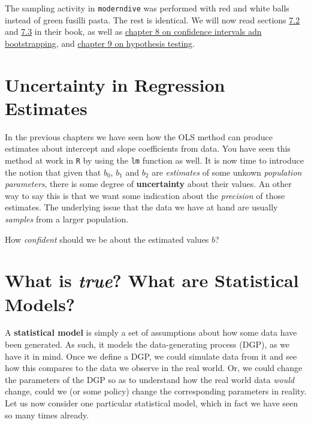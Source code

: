\documentclass[]{book}
\newenvironment{note}{\begin{tcolorbox}[colback=blue!5!white,colframe=blue!75!black]}{\end{tcolorbox}}
\begin{document}
The sampling activity in \texttt{moderndive} was performed with red and white balls instead of green fusilli pasta. The rest is identical. We will now read sections \href{https://moderndive.com/7-sampling.html\#sampling-simulation}{7.2} and \href{https://moderndive.com/7-sampling.html\#sampling-framework}{7.3} in their book, as well as \href{https://moderndive.com/8-confidence-intervals.html}{chapter 8 on confidence intervals adn bootstrapping}, and \href{https://moderndive.com/9-hypothesis-testing.html}{chapter 9 on hypothesis testing}.

\hypertarget{uncertainty-in-regression-estimates}{%
\section{Uncertainty in Regression Estimates}\label{uncertainty-in-regression-estimates}}

In the previous chapters we have seen how the OLS method can produce estimates about intercept and slope coefficients from data. You have seen this method at work in \texttt{R} by using the \texttt{lm} function as well. It is now time to introduce the notion that given that \(b_0\), \(b_1\) and \(b_2\) are \emph{estimates} of some unkown \emph{population parameters}, there is some degree of \textbf{uncertainty} about their values. An other way to say this is that we want some indication about the \emph{precision} of those estimates. The underlying issue that the data we have at hand are usually \emph{samples} from a larger population.

\begin{note}
How \emph{confident} should we be about the estimated values \(b\)?
\end{note}

\hypertarget{what-is-true-what-are-statistical-models}{%
\section{\texorpdfstring{What is \emph{true}? What are Statistical Models?}{What is true? What are Statistical Models?}}\label{what-is-true-what-are-statistical-models}}

A \textbf{statistical model} is simply a set of assumptions about how some data have been generated. As such, it models the data-generating process (DGP), as we have it in mind. Once we define a DGP, we could simulate data from it and see how this compares to the data we observe in the real world. Or, we could change the parameters of the DGP so as to understand how the real world data \emph{would} change, could we (or some policy) change the corresponding parameters in reality. Let us now consider one particular statistical model, which in fact we have seen so many times already.
\end{document}
